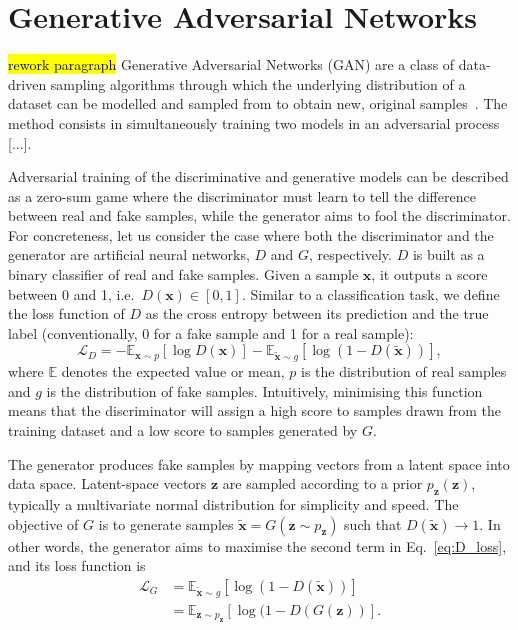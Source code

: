 



\section{Generative Adversarial Networks} %
\hl{rework paragraph}
Generative Adversarial Networks (GAN) are a class of data-driven sampling algorithms through which the underlying distribution of a dataset can be modelled and sampled from to obtain new, original samples~\cite{goodfellow_generative_2014}. %
The method consists in simultaneously training two models in an adversarial process [...].

Adversarial training of the discriminative and generative models can be described as a zero-sum game where the discriminator must learn to tell the difference between real and fake samples, while the generator aims to fool the discriminator.
For concreteness, let us consider the case where both the discriminator and the generator are artificial neural networks, $D$ and $G$, respectively. $D$ is built as a binary classifier of real and fake samples. Given a sample $\mathbf{x}$, it outputs a score between 0 and 1, i.e.\ $D(\mathbf{x}) \in [0, 1]$. Similar to a classification task, we define the loss function of $D$ as the cross entropy between its prediction and the true label (conventionally, 0 for a fake sample and 1 for a real sample):
\begin{equation}\label{eq:D_loss}
    \mathcal{L}_D = 
    -\mathbb{E}_{\mathbf{x} \sim p} [ \log D(\mathbf{x}) ] -
    \mathbb{E}_{\tilde{\mathbf{x}} \sim g} [ \log( 1 - D(\tilde{\mathbf{x}}) )],
\end{equation}
where $\mathbb{E}$ denotes the expected value or mean, $p$ is the distribution of real samples and $g$ is the distribution of fake samples.
Intuitively, minimising this function means that the discriminator will assign a high score to samples drawn from the training dataset and a low score to samples generated by $G$.

The generator produces fake samples by mapping vectors from a latent space into data space. Latent-space vectors $\mathbf{z}$ are sampled according to a prior $p_\mathbf{z}(\mathbf{z})$, typically a multivariate normal distribution for simplicity and speed. The objective of $G$ is to generate samples $\tilde{\mathbf{x}} = G(\mathbf{z} \sim p_\mathbf{z})$ such that $D(\tilde{\mathbf{x}}) \rightarrow 1$. In other words, the generator aims to maximise the second term in Eq.~\ref{eq:D_loss}, and its loss function is
\begin{align*}
    \mathcal{L}_G &=     
    \mathbb{E}_{\tilde{\mathbf{x}} \sim g} [ \log( 1 - D(\tilde{\mathbf{x}}) )]\\
    &= \mathbb{E}_{\mathbf{z} \sim p_\mathbf{z}} [ \log( 1 - D(G(\mathbf{z}) )].
\end{align*}


